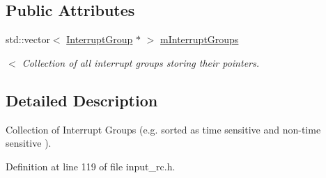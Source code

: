 \subsection*{Public Attributes}
\begin{DoxyCompactItemize}
\item 
std\+::vector$<$ \hyperlink{classSPMB_1_1InterruptGroup}{Interrupt\+Group} $\ast$ $>$ \hyperlink{classSPMB_1_1InterruptManager_a103e2348c57eecaab0605c196f3b924b}{m\+Interrupt\+Groups}\hypertarget{classSPMB_1_1InterruptManager_a103e2348c57eecaab0605c196f3b924b}{}\label{classSPMB_1_1InterruptManager_a103e2348c57eecaab0605c196f3b924b}

\begin{DoxyCompactList}\small\item\em $<$ Collection of all interrupt groups storing their pointers. \end{DoxyCompactList}\end{DoxyCompactItemize}


\subsection{Detailed Description}
Collection of Interrupt Groups (e.\+g. sorted as time sensitive and non-\/time sensitive ). 

Definition at line 119 of file input\+\_\+rc.\+h.

